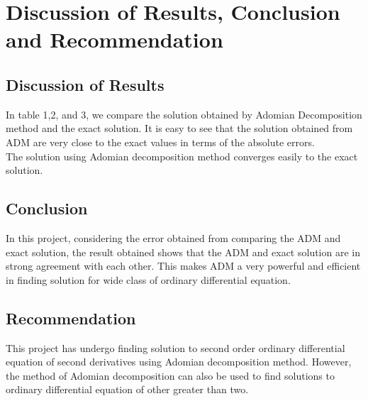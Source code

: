 \documentclass[11pt]{report}
\newcommand{\NI}{\noindent}
\begin{document}
	
	
	\chapter{}
	
	




























	
	\chapter{Discussion of Results, Conclusion and Recommendation}
	\section{Discussion of Results}
	In table 1,2, and 3, we compare the solution obtained by Adomian Decomposition method and the exact solution. It is easy to see that the solution obtained from ADM are very close to the exact values in terms of the absolute errors.\\
	
	\NI The solution using Adomian decomposition method converges easily to the exact solution.
	
	\section{Conclusion}
	In this project, considering the error obtained from comparing the ADM and exact solution, the result obtained shows that the ADM and exact solution are in strong agreement with each other. This makes ADM a very powerful and efficient in finding solution for wide class of ordinary differential equation.
	
	\section{Recommendation}
	This project has undergo finding solution to second order ordinary differential equation of second derivatives using Adomian decomposition method. However, the method of Adomian decomposition can also be used to find solutions to ordinary differential equation of other greater than two.\\
	
\end{document}
